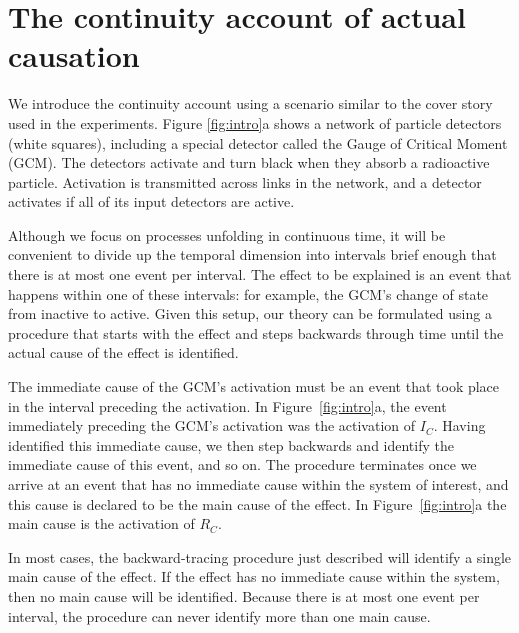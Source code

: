 \documentclass[10pt,letterpaper]{article}
\newcommand{\ev}[2]{$#1_#2$}
\begin{document}

% 

\section{The continuity account of actual causation}

We introduce the continuity account using a scenario similar to the cover story used in the experiments. Figure \ref{fig:intro}a shows a network of particle detectors (white squares), including a special detector called the Gauge of Critical Moment (GCM). The detectors activate and turn black when they absorb a radioactive particle.  Activation is transmitted across links in the network, and a detector activates if all of its input detectors are active. 

Although we focus on processes unfolding in continuous time, it will be convenient to divide up the temporal dimension into intervals brief enough that there is at most one event per interval. The effect to be explained is an event that happens within one of these intervals: for example, the GCM's change of state from inactive to active. Given this setup, our theory can be formulated using a procedure that starts with the effect and steps backwards through time until the actual cause of the effect is identified.

The immediate cause of the GCM's activation must be an event that took place in the interval preceding the activation. In Figure~\ref{fig:intro}a, the event immediately preceding the GCM's activation was the activation of \ev{I}{C}. Having identified this immediate cause, we then step backwards and identify the immediate cause of this event, and so on.  The procedure terminates once we arrive at an event that has no immediate cause within the system of interest, 
and this cause is declared to be the main cause of the effect.  In Figure~\ref{fig:intro}a the main cause is the activation of \ev{R}{C}. 

In most cases, the backward-tracing procedure just described will identify a single main cause of the effect. If the effect has no immediate cause within the system, then no main cause will be identified. Because there is at most one event per interval, the procedure can never identify more than one main cause.
\end{document}
